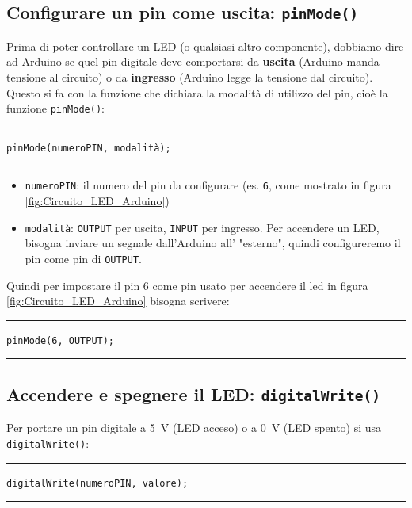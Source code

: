 \subsection*{Configurare un pin come uscita: \texttt{pinMode()}}

Prima di poter controllare un LED (o qualsiasi altro componente), dobbiamo dire ad Arduino se quel pin digitale deve comportarsi da \textbf{uscita} (Arduino manda tensione al circuito) o da \textbf{ingresso} (Arduino legge la tensione dal circuito). 
Questo si fa con la funzione che dichiara la modalità di utilizzo del pin, cioè la funzione \texttt{pinMode()}:

\begin{center}
    \hrule
    \vspace{0.2cm}
    \texttt{pinMode(numeroPIN, modalità);}
    \vspace{0.2cm}
    \hrule
\end{center}

\begin{itemize}
    \item \texttt{numeroPIN}: il numero del pin da configurare (es. \texttt{6}, come mostrato in figura \ref{fig:Circuito_LED_Arduino})
    \item \texttt{modalità}: \texttt{OUTPUT} per uscita, \texttt{INPUT} per ingresso. Per accendere un LED, bisogna inviare un segnale dall'Arduino all' "esterno", quindi configureremo il pin come pin di \texttt{OUTPUT}.
\end{itemize}

Quindi per impostare il pin 6 come pin usato per accendere il led in figura \ref{fig:Circuito_LED_Arduino} bisogna scrivere:
\begin{center}
    \hrule
    \vspace{0.2cm}
    \texttt{pinMode(6, OUTPUT);}
    \vspace{0.2cm}
    \hrule
\end{center}

\subsection*{Accendere e spegnere il LED: \texttt{digitalWrite()}}

Per portare un pin digitale a \SI{5}{\volt} (LED acceso) o a \SI{0}{\volt} 
(LED spento) si usa \texttt{digitalWrite()}:

\begin{center}
    \hrule
    \vspace{0.2cm}
\texttt{digitalWrite(numeroPIN, valore);}
    \vspace{0.2cm}
    \hrule
\end{center}

